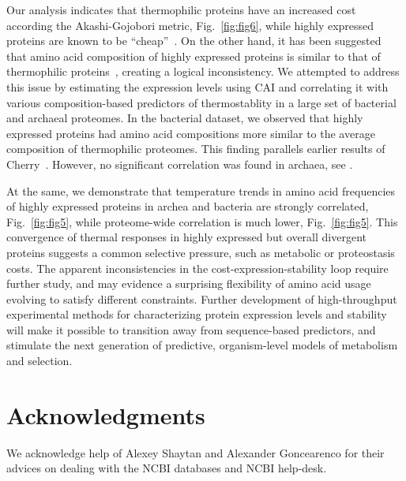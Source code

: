 \documentclass[10pt,letterpaper]{article}
\begin{document}
Our analysis indicates that thermophilic proteins have an increased cost according the Akashi-Gojobori metric, Fig.~\ref{fig:fig6}, while highly expressed proteins are known to be ``cheap''~\cite{Akashi2002Metabolic}. On the other hand, it has been suggested that amino acid composition of highly expressed proteins is similar to that of thermophilic proteins~\cite{Cherry2010Highly}, creating a logical inconsistency. We attempted to address this issue by estimating the expression levels using CAI and correlating it with various composition-based predictors of thermostablity in a large set of bacterial and archaeal proteomes. In the bacterial dataset, we observed that highly expressed proteins had amino acid compositions more similar to the average composition of thermophilic proteomes. This finding parallels earlier results of Cherry~\cite{Cherry2010Highly}. However, no significant correlation was found in archaea, see . 

At the same, we demonstrate that temperature trends in amino acid frequencies of highly expressed proteins in archea and bacteria are strongly correlated, Fig.~\ref{fig:fig5}, while proteome-wide correlation is much lower, Fig.~\ref{fig:fig5}. This convergence of thermal responses in highly expressed but overall divergent proteins suggests a common selective pressure, such as metabolic or proteostasis costs. The apparent inconsistencies in the cost-expression-stability loop require further study, and may evidence a surprising flexibility of amino acid usage evolving to satisfy different constraints. Further development of high-throughput experimental methods for characterizing protein expression levels and stability will make it possible to transition away from sequence-based predictors, and stimulate the next generation of predictive, organism-level models of metabolism and selection.





\section*{Acknowledgments}

We acknowledge help of Alexey Shaytan and Alexander Goncearenco for their advices on dealing with the NCBI databases and NCBI help-desk.
\end{document}
